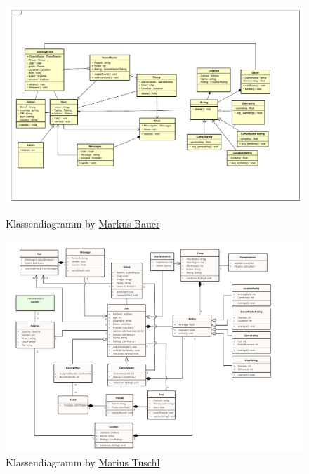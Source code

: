 	\begin{figure}[h!]
		\centering
		\includegraphics[width =\linewidth]{docs/5_Klassendiagramme/Markus/Klassendiagramm.pdf}
		\label{fig:ClassDia_Markus}
		\caption*{Klassendiagramm by \hyperref[person:MarkusBauer]{Markus Bauer}}
	\end{figure}

	\begin{figure}[h!]
		\centering
		\includegraphics[width = \linewidth]{docs/5_Klassendiagramme/Marius/DomainLayer.pdf}
		\caption*{Klassendiagramm by \hyperref[person:MariusTuschl]{Marius Tuschl}}
	\end{figure}

